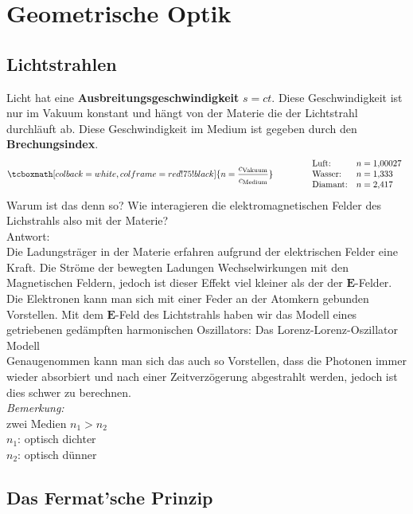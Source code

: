 \documentclass[titlepage,11pt,a4paper,ngerman]{report}
\newcommand{\tx}[1]{\textrm{#1}}
\renewcommand{\vec}[1]{\boldsymbol{#1}}
\newcommand{\lcom}[1]{\color{MidnightBlue}#1\color{black}}
\newcommand{\rmbox}[1]{\tcboxmath[colback=white,colframe=red!75!black]{#1}}
\begin{document}
 
\chapter{Geometrische Optik}

\section{Lichtstrahlen}
Licht hat eine \textbf{Ausbreitungsgeschwindigkeit} $ s = ct $. Diese Geschwindigkeit ist nur im Vakuum konstant und hängt von der Materie die der Lichtstrahl durchläuft ab. Diese Geschwindigkeit im Medium ist gegeben durch den \textbf{Brechungsindex}.
\begin{equation*}
\rmbox{n = \frac{c_{\tx{Vakuum}}}{c_{\tx{Medium}}}} \qquad \qquad \begin{array}{ll}
\tx{Luft:} & n = 1{,}00027 \\
\tx{Wasser:} & n = 1{,}333 \\
\tx{Diamant:} & n = 2{,}417
\end{array}
\end{equation*}
\lcom{Warum ist das denn so? Wie interagieren die elektromagnetischen Felder des Lichstrahls also mit der Materie?}\\
Antwort:\\
\lcom{Die Ladungsträger in der Materie erfahren aufgrund der elektrischen Felder eine Kraft. Die Ströme der bewegten Ladungen Wechselwirkungen mit den Magnetischen Feldern, jedoch ist dieser Effekt viel kleiner als der der $ \vec{E} $-Felder.\\
Die Elektronen kann man sich mit einer Feder an der Atomkern gebunden Vorstellen. Mit dem $ \vec{E} $-Feld des Lichtstrahls haben wir das Modell eines getriebenen gedämpften harmonischen Oszillators: Das Lorenz-Lorenz-Oszillator Modell}\\
Genaugenommen kann man sich das auch so Vorstellen, dass die Photonen immer wieder absorbiert und nach einer Zeitverzögerung abgestrahlt werden, jedoch ist dies schwer zu berechnen.\\[10pt]
\emph{Bemerkung:}\\
zwei Medien $ n_1 > n_2 $\\
$ n_1 $: optisch dichter\\
$ n_2 $: optisch dünner

\section{Das Fermat'sche Prinzip}
\end{document}
